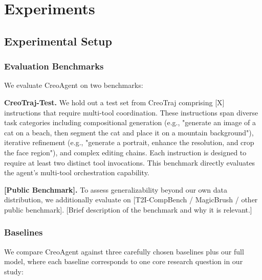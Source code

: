 \documentclass{article}
\begin{document}
\section{Experiments}

\subsection{Experimental Setup}

\subsubsection{Evaluation Benchmarks}

We evaluate CreoAgent on two benchmarks:

\textbf{CreoTraj-Test.} We hold out a test set from CreoTraj comprising [X] instructions that require multi-tool coordination. These instructions span diverse task categories including compositional generation (e.g., "generate an image of a cat on a beach, then segment the cat and place it on a mountain background"), iterative refinement (e.g., "generate a portrait, enhance the resolution, and crop the face region"), and complex editing chains. Each instruction is designed to require at least two distinct tool invocations. This benchmark directly evaluates the agent's multi-tool orchestration capability.

\textbf{[Public Benchmark].} To assess generalizability beyond our own data distribution, we additionally evaluate on [T2I-CompBench / MagicBrush / other public benchmark]. [Brief description of the benchmark and why it is relevant.]

\subsubsection{Baselines}

We compare CreoAgent against three carefully chosen baselines plus our full model, where each baseline corresponds to one core research question in our study:
\end{document}
